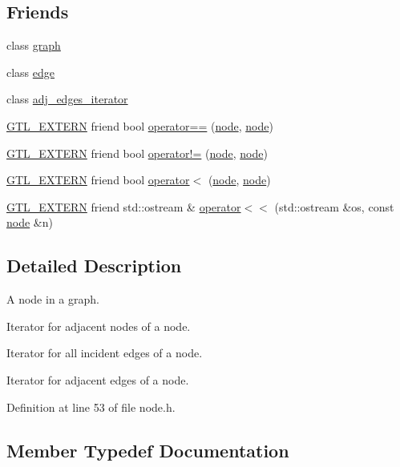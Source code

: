 \subsection*{Friends}
\begin{DoxyCompactItemize}
\item 
class \mbox{\hyperlink{classnode_ab8b0dbc1b36724e5e4635ac651c218cb}{graph}}
\item 
class \mbox{\hyperlink{classnode_a534891c80172dde5e777a3908cc6e2f1}{edge}}
\item 
class \mbox{\hyperlink{classnode_abdd49248203010f2d5432dfef22d017a}{adj\+\_\+edges\+\_\+iterator}}
\item 
\mbox{\hyperlink{_g_t_l_8h_a014cd1e9b3e67a78ae433eda95c8fd25}{G\+T\+L\+\_\+\+E\+X\+T\+E\+RN}} friend bool \mbox{\hyperlink{classnode_a80fc8f2b4af1f3a8a9edb36ab2e89747}{operator==}} (\mbox{\hyperlink{classnode}{node}}, \mbox{\hyperlink{classnode}{node}})
\item 
\mbox{\hyperlink{_g_t_l_8h_a014cd1e9b3e67a78ae433eda95c8fd25}{G\+T\+L\+\_\+\+E\+X\+T\+E\+RN}} friend bool \mbox{\hyperlink{classnode_a57d3666e4a9d57001d86b18da29bc174}{operator!=}} (\mbox{\hyperlink{classnode}{node}}, \mbox{\hyperlink{classnode}{node}})
\item 
\mbox{\hyperlink{_g_t_l_8h_a014cd1e9b3e67a78ae433eda95c8fd25}{G\+T\+L\+\_\+\+E\+X\+T\+E\+RN}} friend bool \mbox{\hyperlink{classnode_a3a5ba8f74b565f5fc4d409d3d350320e}{operator$<$}} (\mbox{\hyperlink{classnode}{node}}, \mbox{\hyperlink{classnode}{node}})
\item 
\mbox{\hyperlink{_g_t_l_8h_a014cd1e9b3e67a78ae433eda95c8fd25}{G\+T\+L\+\_\+\+E\+X\+T\+E\+RN}} friend std\+::ostream \& \mbox{\hyperlink{classnode_a1da0a071bacaedcea8b018d6648a7505}{operator$<$$<$}} (std\+::ostream \&os, const \mbox{\hyperlink{classnode}{node}} \&n)
\end{DoxyCompactItemize}


\subsection{Detailed Description}
A node in a graph. 

Iterator for adjacent nodes of a node.

Iterator for all incident edges of a node.

Iterator for adjacent edges of a node. 

Definition at line 53 of file node.\+h.



\subsection{Member Typedef Documentation}
\mbox{\label{classnode_a9a96be92add7c1a2771bcd0431ebf8ab}} 
